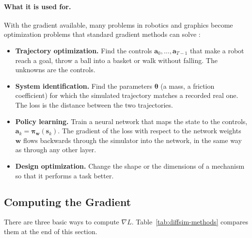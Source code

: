 \paragraph{What it is used for.}
With the gradient available, many problems in robotics and graphics become
optimization problems that standard gradient methods can solve
\citep{newbury2024review}:
\begin{itemize}
  \item \textbf{Trajectory optimization.} Find the controls
    $\mathbf{a}_0, \dots, \mathbf{a}_{T-1}$ that make a robot reach a
    goal, throw a ball into a basket or walk without falling. The unknowns
    are the controls.
  \item \textbf{System identification.} Find the parameters
    $\boldsymbol{\theta}$ (a mass, a friction coefficient) for which the
    simulated trajectory matches a recorded real one. The loss is the
    distance between the two trajectories.
  \item \textbf{Policy learning.} Train a neural network that maps the
    state to the controls, $\mathbf{a}_k = \boldsymbol{\pi}_{\mathbf{w}}(\mathbf{s}_k)$.
    The gradient of the loss with respect to the network weights
    $\mathbf{w}$ flows backwards through the simulator into the network,
    in the same way as through any other layer.
  \item \textbf{Design optimization.} Change the shape or the dimensions
    of a mechanism so that it performs a task better.
\end{itemize}

\subsection{Computing the Gradient}
\label{sec:diffsim-gradient}

There are three basic ways to compute $\nabla L$. Table~\ref{tab:diffsim-methods}
compares them at the end of this section.

